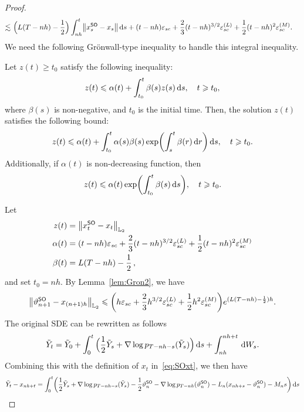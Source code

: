 \begin{proof}
\begin{align*}
    \lesssim& \,\, \Big(L(T-nh)-\dfrac{1}{2}\Big)\int_{nh}^t\l|x_s^{\sf SO}-x_s\r|\rmd s+(t-nh)\varepsilon_{sc}+\dfrac{2}{3}(t-nh)^{3/2}\varepsilon_{sc}^{(L)}+\dfrac{1}{2}(t-nh)^2\varepsilon_{sc}^{(M)}.
\end{align*}
We need the following Gr{\"o}nwall-type inequality to handle this integral inequality.
\begin{lemma}
    \label{lem:Gron2}
    Let $z(t)\geqslant t_0$ satisfy the following inequality:
    \begin{align*}
        z(t)\leqslant \alpha(t)+\int_{t_0}^t\beta(s)z(s){\,\rm d} s,\quad t\geqslant t_0,
    \end{align*}
    where $\beta(s)$ is non-negative, and $t_0$ is the initial time. Then, the solution $z(t)$ satisfies the following bound:
    \begin{align*}
        z(t)\leqslant \alpha(t)+\int_{t_0}^t\alpha(s)\beta(s)\exp\left(\int_s^t\beta(r)\rmd r\right)\rmd s,\quad t\geqslant t_0.
    \end{align*}
    Additionally, if $\alpha(t)$ is non-decreasing function, then
    \begin{align*}
        z(t)\leqslant\alpha(t)\exp\left(\int_{t_0}^t\beta(s)\rmd s\right),\quad t\geqslant t_0.
    \end{align*}
\end{lemma}
Let 
\begin{align*}
z(t)&=\l|x_t^{\sf SO}-x_t\r|_{\Ltwo}\\
\alpha(t)&=(t-nh)\varepsilon_{sc}+\dfrac{2}{3}(t-nh)^{3/2}\varepsilon_{sc}^{(L)}+\dfrac{1}{2}(t-nh)^2\varepsilon_{sc}^{(M)}\\
\beta(t)&=L(T-nh)-\dfrac{1}{2}\,,
\end{align*}
and set $t_0=nh$. By Lemma~\ref{lem:Gron2}, we have
\begin{align}
    \label{eq:SO1}
    \l|\vartheta_{n+1}^{\sf SO}-x_{(n+1)h}\r|_{\Ltwo}\leqslant\left(h\varepsilon_{sc}+\dfrac{2}{3}h^{3/2}\varepsilon_{sc}^{(L)}+\dfrac{1}{2}h^2\varepsilon_{sc}^{(M)}\right)e^{(L(T-nh)-\frac{1}{2})h}.
\end{align}
The original SDE can be rewritten as follows
\begin{align*}
\tilde{Y}_t=\tilde{Y}_0+\int_0^t\Big(\dfrac{1}{2}\tilde{Y}_s+\nabla\log p_{T-nh-s}(\tilde{Y}_s)\Big){\,\rm d} s+\int_{nh}^{nh+t}{\,\rm d} W_s.
\end{align*}
Combining this with the definition of $x_{t}$ in~\eqref{eq:SOxt}, we then have
\begin{align*}
\tilde{Y}_t-x_{nh+t}&=\int_0^t\left(\dfrac{1}{2}\tilde{Y}_s+\nabla\log p_{T-nh-s}(\tilde{Y}_s)-\dfrac{1}{2}\vartheta_n^{\sf SO}-\nabla\log p_{T-nh}(\vartheta_n^{\sf SO})-L_n(x_{nh+s}-\vartheta_n^{\sf SO})-M_ns\right)\rmd s\\

\end{align*}
\end{proof}
